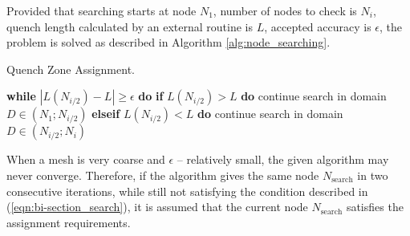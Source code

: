 Provided that searching starts at node $N_1$, number of nodes to check is $N_i$, quench length calculated by an external routine is $L$, accepted accuracy is $\epsilon$, the problem is solved as described in Algorithm \ref{alg:node_searching}.

\begin{algorithm}[H]
    \caption{Quench Zone Assignment.}
    \label{alg:node_searching}
    \begin{algorithmic}[1]

    \STATE \textbf{while} $|L(N_{i/2}) - L| \geq \epsilon$ \textbf{do}
    \STATE \hspace{0.5cm} \textbf{if} $L(N_{i/2}) > L$ \textbf{do}
    \STATE \hspace{1.0cm} continue search in domain $D \in (N_1;N_{i/2})$
    \STATE \hspace{0.5cm} \textbf{elseif} $L(N_{i/2}) < L$ \textbf{do}
    \STATE \hspace{1.0cm} continue search in domain $D \in (N_{i/2}; N_i)$
    \end{algorithmic}
\end{algorithm}

When a mesh is very coarse and $\epsilon$ -- relatively small, the given algorithm may never converge. Therefore, if the algorithm gives the same node $N_\text{search}$ in two consecutive iterations, while still not satisfying the condition described in (\ref{eqn:bi-section_search}), it is assumed that the current node $N_\text{search}$ satisfies the assignment requirements.